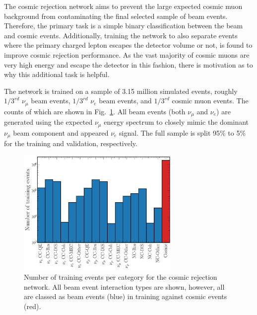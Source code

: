 The cosmic rejection network aims to prevent the large expected cosmic muon background from
contaminating the final selected sample of beam events. Therefore, the primary task is a simple
binary classification between the beam and cosmic events. Additionally, training the network to
also separate events where the primary charged lepton escapes the detector volume or not, is found
to improve cosmic rejection performance. As the vast majority of cosmic muons are very high energy
and escape the detector in this fashion, there is motivation as to why this additional task is
helpful.

The network is trained on a sample of 3.15 million simulated events, roughly $1/3^{rd}$
$\nu_{\mu}$ beam events, $1/3^{rd}$ $\nu_{e}$ beam events, and $1/3^{rd}$ cosmic muon events. The
counts of which are shown in Fig.~\ref{fig:cosmic_training_sample}. All beam events (both
$\nu_{\mu}$ and $\nu_{e}$) are generated using the expected \chips $\nu_{\mu}$ energy spectrum to
closely mimic the dominant $\nu_{\mu}$ beam component and appeared $\nu_{e}$ signal. The full
sample is split 95\% to 5\% for the training and validation, respectively.

\begin{figure} %
    \includegraphics[width=0.7\textwidth]{diagrams/6-cvn/chipsnet/explore_cosmic_training_sample.pdf}
    \caption[Number of training events per category for the cosmic rejection network.]
    {Number of training events per category for the cosmic rejection network. All beam event
        interaction types are shown, however, all are classed as beam events (blue) in training
        against cosmic events (red).}
    \label{fig:cosmic_training_sample}
\end{figure}

